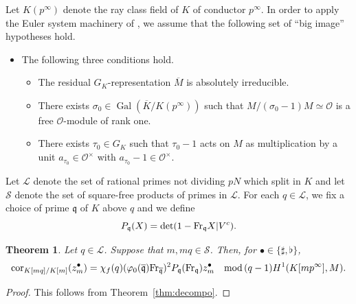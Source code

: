 \documentclass{amsart}
\makeatletter
\numberwithin{equation}{section}
\newcommand{\mylabel}[2]{#2\def\@currentlabel{#2}\label{#1}}
\newtheorem{theorem}{Theorem}[section]
\newtheorem*{hyp}{Hypothesis}
\newcommand{\frk}{\mathfrak}
\newcommand{\Gal}{\operatorname{Gal}}
\newcommand{\cor}{\mathrm{cor}}
\newcommand{\Fr}{{\rm Fr}}
\makeatother
\begin{document}
\subsubsection{} 
\label{subsubsec_2025_10_30_0947}
Let $K(p^\infty)$ denote the ray class field of $K$ of conductor $p^\infty$. In order to apply the Euler system machinery of \cite{JNS}, we assume that the following set of ``big image'' hypotheses hold.
 \begin{itemize}
        \item[(\mylabel{item_BI}{$\mathbf{BI}$})] The following three conditions hold.
         \begin{itemize}
\item[(\mylabel{item_BI0}{$\mathbf{BI}_0$})] The residual $G_K$-representation $\overline{M}$ is absolutely irreducible.
 \item[(\mylabel{item_BI1}{$\mathbf{BI}_1$}$)$]There exists $\sigma_0 \in \Gal(\overline{K}/K(p^\infty))$ such that $M/(\sigma_0-1)M \simeq \mathcal{O}$ is a free $\mathcal{O}$-module of rank one.
 \item[(\mylabel{item_BI2}{$\mathbf{BI}_2$}$)$] There exists $\tau_0 \in G_K$ such that $\tau_0-1$ acts on $M$ as multiplication by a unit $a_{\tau_0}\in\mathcal{O}^\times$ with $a_{\tau_0}-1\in\mathcal O^{\times}$.
  \end{itemize}
    \end{itemize}




Let $\mathcal{L}$ denote the set of rational primes not dividing $pN$ which split in $K$ and let $\mathcal{S}$ denote the set of square-free products of primes in $\mathcal{L}$. For each $q\in \mathcal{L}$, we fix a choice of prime $\frk{q}$ of $K$ above $q$ and we define
\[
P_\frk{q}(X)=\det(1-\Fr_\frk{q}X\vert V^c).
\]

\begin{theorem}\label{thm:tamenormrelations}
    Let $q\in \mathcal{L}$. Suppose that $m, mq\in \mathcal{S}$. Then, for $\bullet\in \lbrace \sharp,\flat\rbrace$,
    \[
    \cor_{K[mq]/K[m]} (z_m^\bullet)=\chi_f(q)(\varphi_0(\overline{\frk{q}}) \Fr_{\overline{\frk{q}}})^2 P_{\frk{q}}(\Fr_{\frk{q}}) z_{m}^\bullet \quad \mathrm{mod}\, (q-1)H^1(K[mp^\infty],M). 
    \]
\end{theorem}
\begin{proof}
    This follows from Theorem~\ref{thm:decompo}. 
\end{proof}
\end{document}
